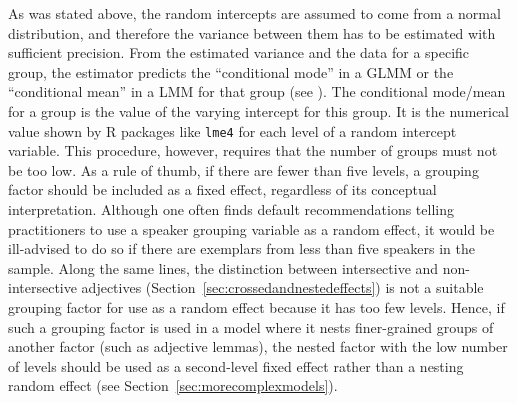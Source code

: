 As was stated above, the random intercepts are assumed to come from a normal distribution, and therefore the variance between them has to be estimated with sufficient precision.
From the estimated variance and the data for a specific group, the estimator predicts the ``conditional mode'' in a GLMM or the ``conditional mean'' in a LMM for that group (see \citealt[Ch.~1]{Bates2010}).
The conditional mode\slash mean for a group is the value of the varying intercept for this group.
It is the numerical value shown by R packages like \texttt{lme4} for each level of a random intercept variable.
This procedure, however, requires that the number of groups must not be too low.
As a rule of thumb, if there are fewer than five levels, a grouping factor should be included as a fixed effect, regardless of its conceptual interpretation.
Although one often finds default recommendations telling practitioners to use a speaker grouping variable as a random effect, it would be ill-advised to do so if there are exemplars from less than five speakers in the sample.
Along the same lines, the distinction between intersective and non-intersective adjectives (Section~\ref{sec:crossedandnestedeffects}) is not a suitable grouping factor for use as a random effect because it has too few levels.
Hence, if such a grouping factor is used in a model where it nests finer-grained groups of another factor (such as adjective lemmas), the nested factor with the low number of levels should be used as a second-level fixed effect rather than a nesting random effect (see Section~\ref{sec:morecomplexmodels}).

